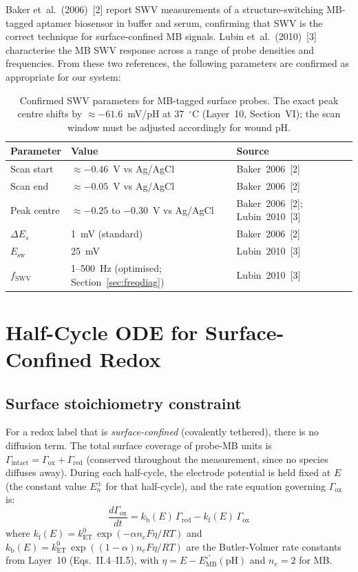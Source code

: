 \documentclass[10pt,a4paper]{article}
\numberwithin{equation}{section}
\newcommand{\kET}{k_{\text{ET}}^{0}}
\newcommand{\kf}{k_{\text{f}}}
\newcommand{\kb}{k_{\text{b}}}
\newcommand{\cit}[1]{[#1]}
\newcommand{\Eo}{E^{\circ\prime}}
\newcommand{\Gox}{\Gamma_{\text{ox}}}
\newcommand{\Gred}{\Gamma_{\text{red}}}
\newcommand{\Gtot}{\Gamma_{\text{intact}}}
\newcommand{\Esw}{E_{\text{sw}}}
\newcommand{\Des}{\Delta E_s}
\begin{document}
Baker et~al.~(2006)~\cit{2} report SWV measurements of a structure-switching
MB-tagged aptamer biosensor in buffer and serum, confirming that
SWV is the correct technique for surface-confined MB signals.
Lubin et~al.~(2010)~\cit{3} characterise the MB SWV response across
a range of probe densities and frequencies. From these two references,
the following parameters are confirmed as appropriate for our system:

\begin{table}[H]
\centering
\small\renewcommand{\arraystretch}{1.25}
\begin{tabular}{@{}lll@{}}
\toprule
Parameter & Value & Source \\
\midrule
Scan start & $\approx -0.46$~V vs Ag/AgCl & Baker~2006~\cit{2} \\
Scan end   & $\approx -0.05$~V vs Ag/AgCl & Baker~2006~\cit{2} \\
Peak centre & $\approx -0.25$ to $-0.30$~V vs Ag/AgCl & Baker~2006~\cit{2}; Lubin~2010~\cit{3} \\
$\Des$     & 1~mV (standard) & Baker~2006~\cit{2} \\
$\Esw$     & 25~mV & Lubin~2010~\cit{3} \\
$f_{\text{SWV}}$ & 1--500~Hz (optimised; Section~\ref{sec:freqdiag}) & Lubin~2010~\cit{3} \\
\bottomrule
\end{tabular}
\caption{Confirmed SWV parameters for MB-tagged surface probes.
The exact peak centre shifts by $\approx -61.6$~mV/pH at
37~$^\circ$C (Layer~10, Section~VI); the scan window must be
adjusted accordingly for wound pH.}
\label{tab:swvparams}
\end{table}

\section{Half-Cycle ODE for Surface-Confined Redox}
\label{sec:ode}

\subsection{Surface stoichiometry constraint}

For a redox label that is \textit{surface-confined} (covalently tethered),
there is no diffusion term. The total surface coverage of probe-MB
units is $\Gtot = \Gox + \Gred$ (conserved throughout the measurement,
since no species diffuses away). During each half-cycle, the electrode
potential is held fixed at $E$ (the constant value $E_n^\pm$ for that
half-cycle), and the rate equation governing $\Gox$ is:
\begin{equation}
  \frac{d\Gox}{dt} = \kb(E)\,\Gred - \kf(E)\,\Gox
  \label{eq:ode}
\end{equation}
where $\kf(E) = \kET\,\exp(-\alpha n_e F\eta/RT)$ and
$\kb(E) = \kET\,\exp((1-\alpha) n_e F\eta/RT)$ are the Butler-Volmer
rate constants from Layer~10 (Eqs.~II.4--II.5), with
$\eta = E - \Eo_{\text{MB}}(\text{pH})$ and $n_e = 2$ for MB.
\end{document}

